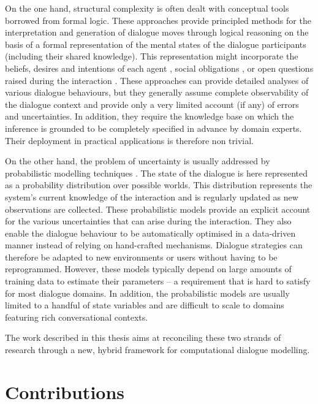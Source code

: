 On the one hand, structural complexity is often dealt with conceptual tools borrowed from formal logic.  These approaches provide principled methods for the interpretation and generation of dialogue moves through logical reasoning on the basis of a formal representation of the mental states of the dialogue participants (including their shared knowledge). This representation might incorporate the beliefs, desires and intentions of each agent \citep{Cohen1979,Allen1980}, social obligations \citep{Traum:1994}, or open questions raised during the interaction \citep{larsson2002,Ginzburg2012}.  These approaches can provide detailed analyses of various dialogue behaviours, but they generally assume complete observability of the dialogue context and provide only a very limited account (if any) of errors and uncertainties. In addition, they require the knowledge base on which the inference is grounded to be completely specified in advance by domain experts.  Their deployment in practical applications is therefore non trivial. 

On the other hand, the problem of uncertainty is usually addressed by probabilistic modelling techniques \citep{Roy:2000,FramptonL09,Young:2010}.  The state of the dialogue is here represented as a probability distribution over possible worlds.  This distribution represents the system's current knowledge of the interaction and is regularly updated as new observations are collected. These probabilistic models provide an explicit account for the various uncertainties that can arise during the interaction. They also enable the dialogue behaviour to be automatically optimised in a data-driven manner instead of relying on hand-crafted mechanisms.  Dialogue strategies can therefore be adapted to new environments or users without having to be reprogrammed. However, these models typically depend on large amounts of training data to estimate their parameters -- a requirement that is hard to satisfy for most dialogue domains.  In addition, the probabilistic models are usually limited to a handful of state variables and are difficult to scale to domains featuring rich conversational contexts. 

The work described in this thesis aims at reconciling these two strands of research through a new, hybrid framework for computational dialogue modelling. 

\section{Contributions}

